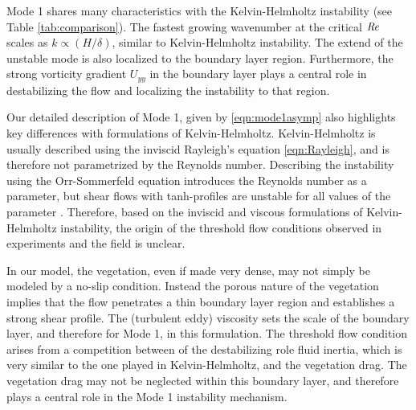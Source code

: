 \documentclass{jfm}
\newcommand{\Ndg}{\tilde{N}_g}
\begin{document}
Mode 1 shares many characteristics with the Kelvin-Helmholtz instability (see Table \ref{tab:comparison}). 
The fastest growing wavenumber at the critical $\mbox{\textit{Re}}$ scales as $k \propto (H/\delta)$, similar to Kelvin-Helmholtz instability. 
The extend of the unstable mode is also localized to the boundary layer region.
Furthermore, the strong vorticity gradient $U_{yy}$ in the boundary layer plays a central role in destabilizing the flow and localizing the instability to that region. 

Our detailed description of Mode 1, given by \eqref{eqn:mode1asymp} also highlights key differences with formulations of Kelvin-Helmholtz. 
Kelvin-Helmholtz is usually described using the inviscid Rayleigh's equation \eqref{eqn:Rayleigh}, and is therefore not parametrized by the Reynolds number.
Describing the instability using the Orr-Sommerfeld equation introduces the Reynolds number as a parameter, but shear flows with tanh-profiles are unstable for all values of the parameter \cite{Drazin81}.
Therefore, based on the inviscid and viscous formulations of Kelvin-Helmholtz instability, the origin of the threshold flow conditions observed in experiments and the field is unclear.

In our model, the vegetation, even if made very dense, may not simply be modeled by a no-slip condition.
Instead the porous nature of the vegetation implies that the flow penetrates a thin boundary layer region and establishes a strong shear profile. 
The (turbulent eddy) viscosity sets the scale of the boundary layer, and therefore for Mode 1, in this formulation.
The threshold flow condition arises from a competition between of the destabilizing role fluid inertia, which is very similar to the one played in Kelvin-Helmholtz, and the vegetation drag.
The vegetation drag may not be neglected within this boundary layer, and therefore plays a central role in the Mode 1 instability mechanism.

\end{document}
